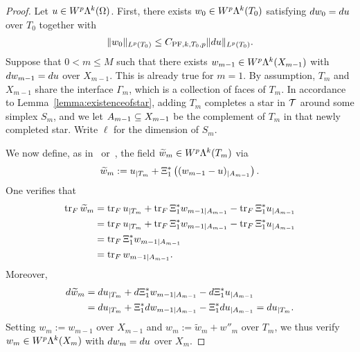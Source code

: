 \documentclass[10pt,a4paper]{article}
\begin{document}
\begin{proof}
    Let $u \in W^{p}\Lambda^{k}(\Omega)$. 
    First, there exists $w_0 \in W^{p}\Lambda^{k}(T_{0})$ satisfying $d w_0 = d u$ over $T_{0}$ together with 
    \begin{gather*}
        \| w_0 \|_{L^{p}(T_{0})} \leq C_{{{\rm PF}},k,T_{0},p} \| d u \|_{L^{p}(T_{0})}.
    \end{gather*}
    Suppose that $0 < m \leq M$ such that there exists $w_{m-1} \in W^{p}\Lambda^{k}(X_{m-1})$ with $d w_{m-1} = d u$ over $X_{m-1}$. 
    This is already true for $m = 1$.
    By assumption, $T_{m}$ and $X_{m-1}$ share the interface $\Gamma_{m}$, which is a collection of faces of $T_{m}$. 
    In accordance to Lemma~\ref{lemma:existenceofstar}, adding $T_{m}$ completes a star in ${\mathcal T}$ around some simplex $S_{m}$, 
    and we let $A_{m-1} \subseteq X_{m-1}$ be the complement of $T_{m}$ in that newly completed star. 
    Write $\ell$ for the dimension of $S_{m}$.
    
    We now define, as in~\cite[Equations~{\char`\(}5.12{\char`\)} and~{\char`\(}5.14{\char`\)}]{ern2020stable} or~\cite[Equations~{\char`\(}6.7{\char`\)} and~{\char`\(}6.9{\char`\)}]{Chaum_Voh_p_rob_3D_H_curl_24}, the field $\widetilde w_{m} \in W^{p}\Lambda^{k}(T_{m})$ via 
    \begin{align} \label{equation:w''_ext_der}
        {\widetilde w}_{m} := u_{|T_m} + \Xi_{1}^{\ast}\left( (w_{m-1} - u)_{|A_{m-1} } \right).
    \end{align}
    One verifies that 
    \begin{align*}
        \operatorname{tr}_F {\widetilde w}_{m} 
        &
        = 
        \operatorname{tr}_F u_{|T_m} + \operatorname{tr}_F \Xi_{1}^{\ast} w_{m-1|A_{m-1} } - \operatorname{tr}_F \Xi_{1}^{\ast} u_{|A_{m-1} } 
        \\&
        = 
        \operatorname{tr}_F u_{|T_m} + \operatorname{tr}_F \Xi_{1}^{\ast} w_{m-1|A_{m-1} } - \operatorname{tr}_F \Xi_{1}^{\ast} u_{|A_{m-1} } 
        \\&
        = 
        \operatorname{tr}_F \Xi_{1}^{\ast} w_{m-1|A_{m-1} }
        \\&
        = 
        \operatorname{tr}_F w_{m-1|A_{m-1}}
        .
    \end{align*}
    Moreover, 
    \begin{align*}
        d {\widetilde w}_{m} 
        &
        = 
        d u_{|T_m} + d \Xi_{1}^{\ast} w_{m-1|A_{m-1} } - d \Xi_{1}^{\ast} u_{|A_{m-1} } 
        \\&
        = 
        d u_{|T_m} + \Xi_{1}^{\ast} d w_{m-1|A_{m-1} } - \Xi_{1}^{\ast} d u_{|A_{m-1} } 
        = 
        d u_{|T_m}
        .
    \end{align*}
    Setting $w_{m} := w_{m-1}$ over $X_{m-1}$ and $w_{m} := {\widetilde w}_{m} + w''_{m}$ over $T_{m}$, 
    we thus verify $w_{m} \in W^{p}\Lambda^{k}(X_{m})$ with $d w_{m} = d u$ over $X_{m}$. 
    

\end{proof}
\end{document}
